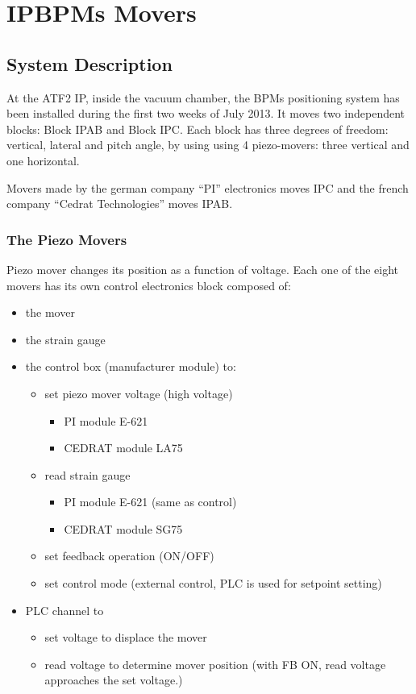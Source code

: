 \chapter{IPBPMs Movers}\label{s:annexB}
\section{System Description}
At the ATF2 IP, inside the vacuum chamber, the BPMs positioning system has been installed during the first two weeks of July 2013. It moves two independent blocks: Block IPAB and Block IPC. Each block has three degrees of freedom: vertical, lateral and pitch angle, by using using 4 piezo-movers: three vertical and one horizontal.\par
Movers made by the german company ``PI'' electronics moves IPC and the french company ``Cedrat Technologies'' moves IPAB.\par
\subsection{The Piezo Movers}
Piezo mover changes its position as a function of voltage. Each one of the eight movers has its own control electronics block composed of: 
\begin{itemize}
 \item the mover
\item the strain gauge
\item the control box (manufacturer module) to:
\begin{itemize}
 \item set piezo mover voltage (high voltage)
 \begin{itemize}
\item PI module E-621
\item CEDRAT module LA75
\end{itemize}
\item read strain gauge
\begin{itemize}
\item PI module E-621 (same as control)
\item CEDRAT module SG75
\end{itemize}
\item set feedback operation (ON/OFF)
\item set control mode (external control, PLC is used for setpoint setting)
\end{itemize}
\item PLC channel to
\begin{itemize}
\item set voltage to displace the mover
\item read voltage to determine mover position (with FB ON, read voltage approaches the set voltage.)
\end{itemize}
\end{itemize}

